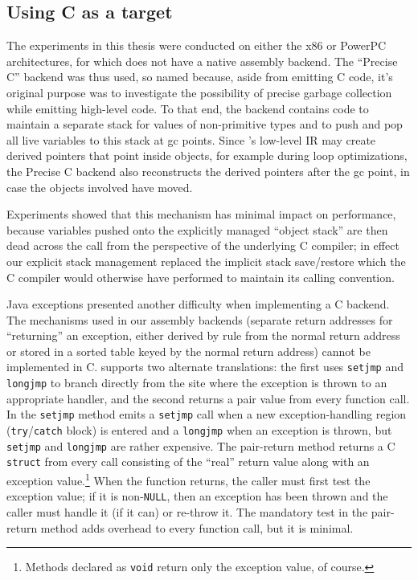 \subsection*{Using C as a target}\label{sec:precisec}
The experiments in this thesis were conducted on either the x86 or
PowerPC architectures, for which \flex does not have a native assembly
backend.  The ``Precise C'' backend was thus used, so named because,
aside from emitting C code, it's original purpose was to investigate
the possibility of precise garbage collection while emitting
high-level code.  To that end, the backend contains code to maintain a
separate stack for values of non-primitive types and to push and pop
all live variables to this stack at gc points.  Since \flex's low-level
IR may create derived pointers that point inside objects, for example
during loop optimizations, the Precise C backend also reconstructs
the derived pointers after the gc point, in case the objects involved
have moved.\label{sec:precise-gc}

Experiments showed that this mechanism has minimal impact on
performance, because variables pushed onto the explicitly managed
``object stack'' are then dead across the call from the perspective
of the underlying C compiler; in effect our explicit stack management
replaced the implicit stack save/restore which the C compiler would
otherwise have performed to maintain its calling convention.

Java exceptions presented another difficulty when implementing a C
backend.  The mechanisms used in our assembly backends (separate
return addresses for ``returning'' an exception, either derived by
rule from the normal return address or stored in a sorted table keyed
by the normal return address) cannot be implemented in C.  \Flex supports
two alternate translations: the first uses \texttt{setjmp} and
\texttt{longjmp} to branch directly from the site where the exception
is thrown to an appropriate handler, and the second returns a pair
value from every function call.  In the \texttt{setjmp} method \flex emits
a \texttt{setjmp} call when a new exception-handling region
(\texttt{try}/\texttt{catch} block) is entered and a \texttt{longjmp}
when an exception is thrown,
but \texttt{setjmp} and \texttt{longjmp} are rather
expensive.  The pair-return method returns a C \texttt{struct} from every
call consisting of the ``real'' return value along with an exception
value.\footnote{Methods declared as \texttt{void} return only the
  exception value, of course.}  When the function returns, the caller
must first test the exception value; if it is non-\texttt{NULL}, then
an exception has been thrown and the caller must handle it (if it can)
or re-throw it.
The mandatory test in the pair-return method adds overhead to every
function call, but it is minimal.  

